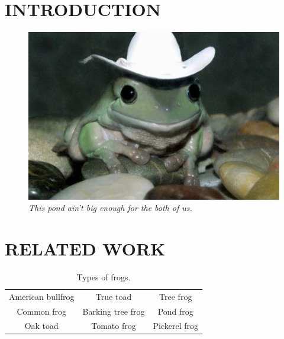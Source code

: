 \documentclass[titlepage]{report}
\begin{document}
	\begin{titlepage}
		\thispagestyle{plain}
		\setcounter{page}{5}
		\begin{center}
			\listoftables
		\end{center}
	\end{titlepage}

	\tableofcontents
	\setcounter{page}{2}

	\section{INTRODUCTION}
	
	\blindtext
	
	\begin{figure}[h!]
		\includegraphics[width=\linewidth]{frog.jpg}
		\caption{\textit{This pond ain't big enough for the both of us.}}
		\label{fig:frog}
	\end{figure}

	\blindtext
	
	\section{RELATED WORK}
	
	\blindtext
	
	\begin{table}[h!]
	\centering
		\begin{tabular}{ |c|c|c| } 
		\hline
		American bullfrog & True toad & Tree frog \\ 
		Common frog & Barking tree frog & Pond frog \\ 
		Oak toad & Tomato frog & Pickerel frog \\ 
		\hline
		\end{tabular}
		\caption{Types of frogs.}	
	\end{table}
\end{document}
